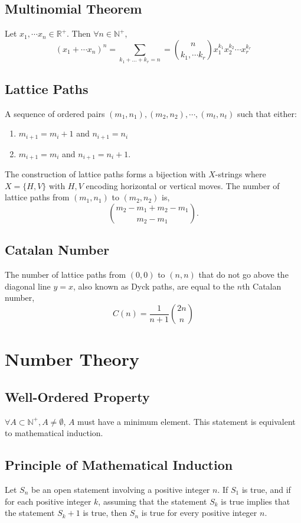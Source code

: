 \documentclass{article}
\begin{document}
\subsection{Multinomial Theorem}
Let $x_1,\cdots x_n \in \mathbb R^+$. Then $\forall n \in \mathbb N^+$,
\[
    (x_1 + \cdots x_n)^n = \sum_{k_1 + ... + k_r = n} = \binom{n}{k_1, \cdots k_r} x_1^{k_1} x_2 ^{k_2} \cdots x_r^{k_r}
\]

\subsection{Lattice Paths}
A sequence of ordered pairs $(m_1, n_1), (m_2, n_2), \cdots, (m_t, n_t)$ such that either:
\begin{enumerate}
    \item $m_{i+1} = m_{i}+1$ and $n_{i+1} = n_{i}$
    \item $m_{i+1} = m_i$ and $n_{i+1} = n_i +1$.
\end{enumerate}
The construction of lattice paths forms a bijection with $X$-strings where $X = \{ H, V\}$ with $H,V$ encoding horizontal or vertical moves. The number of lattice paths from $(m_1, n_1)$ to $(m_2,n_2)$ is,
\[
   \binom{m_2 - m_1 + m_2 - m_1}{m_2-m_1}.
\]

\subsection{Catalan Number}
The number of lattice paths from $(0,0)$ to $(n,n)$ that do not go above the diagonal line $y = x$, also known as Dyck paths, are equal to the $n$th Catalan number,
\[
    C(n) = \frac{1}{n+1} \binom{2n}{n}
\]
\section{Number Theory}

\subsection{Well-Ordered Property}
$\forall A \subset \mathbb N^+, A \neq \emptyset$, $A$ must have a minimum element. This statement is equivalent to mathematical induction.

\subsection{Principle of Mathematical Induction}
Let $S_n$ be an open statement involving a positive integer $n$. If $S_1$ is true, and if for each positive integer $k$, assuming that the statement $S_k$ is true implies that the statement $S_k + 1$ is true, then $S_n$ is true for every positive integer $n$.
\end{document}
